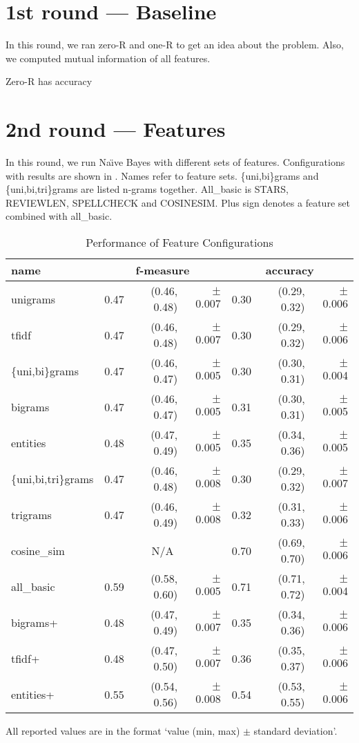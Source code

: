 \section{1st round --- Baseline}

In this round, we ran zero-R and one-R to get an idea about the problem.
Also, we computed mutual information of all features.

Zero-R has accuracy


\section{2nd round --- Features}

In this round, we run Na\"{\i}ve Bayes with different sets of features.
Configurations with results are shown in .
Names refer to feature sets.
\{uni,bi\}grams and \{uni,bi,tri\}grams are listed n-grams together.
All\_basic is STARS, REVIEWLEN, SPELLCHECK and COSINESIM.
Plus sign denotes a feature set combined with all\_basic.

\begin{table}[h!]

\centering
\begin{tabular}{lr@{~}r@{~}rr@{~}r@{~}r}
\toprule
\textbf{name}	& \multicolumn{3}{c}{\textbf{f-measure}} & \multicolumn{3}{c}{\textbf{accuracy}} \\
\midrule
unigrams& 0.47 & (0.46, 0.48) & $\pm$ 0.007 & 0.30 & (0.29, 0.32) & $\pm$ 0.006 \\
tfidf& 0.47 & (0.46, 0.48) & $\pm$ 0.007 & 0.30 & (0.29, 0.32) & $\pm$ 0.006 \\
\{uni,bi\}grams	& 0.47 & (0.46, 0.47) & $\pm$ 0.005 & 0.30 & (0.30, 0.31) & $\pm$ 0.004\\
bigrams & 0.47 & (0.46, 0.47) & $\pm$ 0.005 & 0.31 & (0.30, 0.31) & $\pm$ 0.005			\\
entities & 0.48 & (0.47, 0.49) & $\pm$ 0.005 & 0.35 & (0.34, 0.36) & $\pm$ 0.005		\\
\{uni,bi,tri\}grams & 0.47 & (0.46, 0.48) & $\pm$ 0.008 & 0.30 & (0.29, 0.32) & $\pm$ 0.007	\\
trigrams & 0.47 & (0.46, 0.49) & $\pm$ 0.008 & 0.32 & (0.31, 0.33) & $\pm$ 0.006		\\
cosine\_sim & \multicolumn{3}{c}{N/A} & 0.70 & (0.69, 0.70) & $\pm$ 0.006		\\
all\_basic & 0.59 & (0.58, 0.60) & $\pm$ 0.005 & 0.71 & (0.71, 0.72) & $\pm$ 0.004		\\
bigrams+ & 0.48 & (0.47, 0.49) & $\pm$ 0.007 & 0.35 & (0.34, 0.36) & $\pm$ 0.006		\\
tfidf+ & 0.48 & (0.47, 0.50) & $\pm$ 0.007 & 0.36 & (0.35, 0.37) & $\pm$ 0.006			\\
entities+ & 0.55 & (0.54, 0.56) & $\pm$ 0.008 & 0.54 & (0.53, 0.55) & $\pm$ 0.006		\\
\bottomrule
\end{tabular}






\caption{Performance of Feature Configurations}\label{tab:feat_perf}
All reported values are in the format `value (min, max) $\pm$ standard deviation'.
\end{table}


